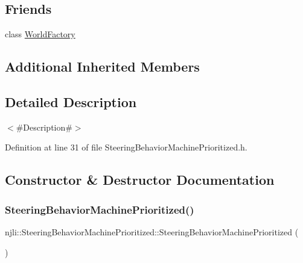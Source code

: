 \subsection*{Friends}
\begin{DoxyCompactItemize}
\item 
class \mbox{\hyperlink{classnjli_1_1_steering_behavior_machine_prioritized_acb96ebb09abe8f2a37a915a842babfac}{World\+Factory}}
\end{DoxyCompactItemize}
\subsection*{Additional Inherited Members}


\subsection{Detailed Description}
$<$\#\+Description\#$>$ 

Definition at line 31 of file Steering\+Behavior\+Machine\+Prioritized.\+h.



\subsection{Constructor \& Destructor Documentation}
\mbox{\label{classnjli_1_1_steering_behavior_machine_prioritized_aa3fcf9e42273167b43484a37544a2f38}} 
\subsubsection{\texorpdfstring{Steering\+Behavior\+Machine\+Prioritized()}{SteeringBehaviorMachinePrioritized()}\hspace{0.1cm}{\footnotesize\ttfamily [1/3]}}
{\footnotesize\ttfamily njli\+::\+Steering\+Behavior\+Machine\+Prioritized\+::\+Steering\+Behavior\+Machine\+Prioritized (\begin{DoxyParamCaption}{ }\end{DoxyParamCaption})\hspace{0.3cm}{\ttfamily [protected]}}

